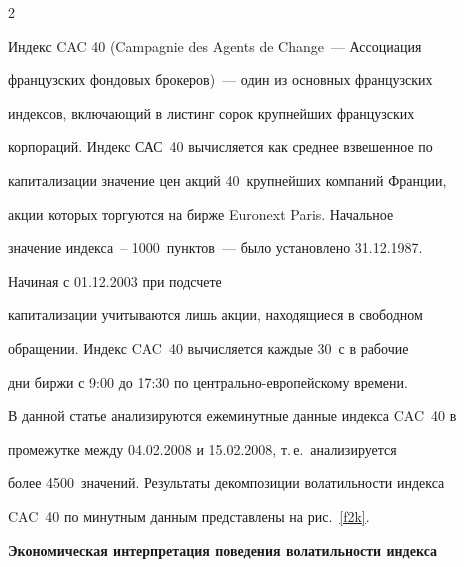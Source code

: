 \begin{multicols}{2}
\begin{figure}


\end{figure}








Индекс CAC 40 (Campagnie des Agents de Change~--- Ассоциация


французских фондовых брокеров)~--- один из основных французских


индексов, включающий в листинг сорок крупнейших французских


корпораций. Индекс САС~40 вычисляется как среднее взвешенное по


капитализации значение цен акций 40~крупнейших компаний Франции,


акции которых торгуются на бирже Euronext Paris. Начальное


значение индекса~-- 1000~пунктов~--- было установлено 31.12.1987.


Начиная с 01.12.2003 при подсчете


капитализации учитываются лишь акции, находящиеся в свободном


обращении. Индекс CAC~40 вычисляется каждые 30~с в рабочие


дни биржи с 9:00 до 17:30 по центрально-европейскому времени.





В данной статье анализируются ежеминутные данные индекса CAC~40 в


промежутке между 04.02.2008 и 15.02.2008, т.\,е.\ анализируется


более 4500~значений. Результаты декомпозиции волатильности индекса


CAC~40 по минутным данным представлены на рис.~\ref{f2k}.





{\bf Экономическая интерпретация поведения волатильности индекса


}
\end{multicols}
